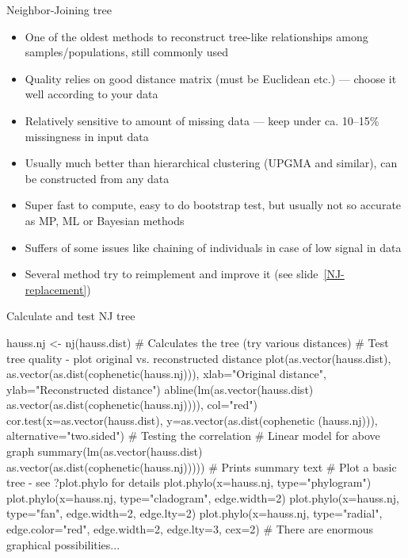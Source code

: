 \documentclass[compress, ucs, xelatex, 11pt, xcolor=svgnames, aspectratio=169,
	hyperref={
		bookmarks=true,
		unicode=true,
		colorlinks=true,
		pdftitle={Molecular data in R},
		plainpages=false,
		pdfauthor={Vojtech Zeisek},
		pdfsubject={Course about phylogeny and evolution in R},
		pdfcreator={XeLaTeX},
		pdfkeywords={R, evolution, phylogeny, molecular data},
		linkcolor=Crimson, %
		anchorcolor=Magenta, %
		citecolor=Magenta, %
		filecolor=Magenta, %
		menucolor=Magenta, %
		urlcolor=DodgerBlue, %
		pdftex},
	url={hyphens, lowtilde} %
	]{beamer}
\begin{document}
\begin{frame}{Neighbor-Joining tree}
	\label{NJ}
	\begin{itemize}
		\item One of the oldest methods to reconstruct tree-like relationships among samples/populations, still commonly used
		\item Quality relies on good distance matrix (must be Euclidean etc.) --- choose it well according to your data
		\item Relatively sensitive to amount of missing data --- keep under ca. 10--15\% missingness in input data
		\item Usually much better than hierarchical clustering (UPGMA and similar), can be constructed from any data
		\item Super fast to compute, easy to do bootstrap test, but usually not so accurate as MP, ML or Bayesian methods
		\item Suffers of some issues like chaining of individuals in case of low signal in data
		\item Several method try to reimplement and improve it (see slide~\ref{NJ-replacement})
	\end{itemize}
\end{frame}

\begin{frame}[fragile]{Calculate and test NJ tree}
	\begin{spluscode}
    hauss.nj <- nj(hauss.dist) # Calculates the tree (try various distances)
    # Test tree quality - plot original vs. reconstructed distance
    plot(as.vector(hauss.dist), as.vector(as.dist(cophenetic(hauss.nj))),
      xlab="Original distance", ylab="Reconstructed distance")
    abline(lm(as.vector(hauss.dist) ~
      as.vector(as.dist(cophenetic(hauss.nj)))), col="red")
    cor.test(x=as.vector(hauss.dist), y=as.vector(as.dist(cophenetic
      (hauss.nj))), alternative="two.sided") # Testing the correlation
    # Linear model for above graph
    summary(lm(as.vector(hauss.dist) ~
      as.vector(as.dist(cophenetic(hauss.nj))))) # Prints summary text
    # Plot a basic tree - see ?plot.phylo for details
    plot.phylo(x=hauss.nj, type="phylogram")
    plot.phylo(x=hauss.nj, type="cladogram", edge.width=2)
    plot.phylo(x=hauss.nj, type="fan", edge.width=2, edge.lty=2)
    plot.phylo(x=hauss.nj, type="radial", edge.color="red", edge.width=2,
      edge.lty=3, cex=2) # There are enormous graphical possibilities...
	\end{spluscode}
\end{frame}
\end{document}
